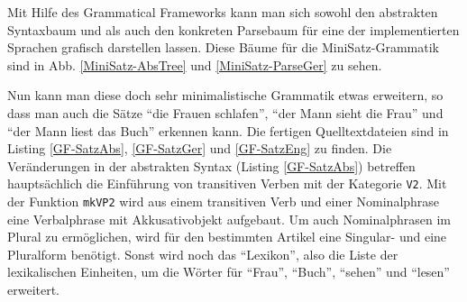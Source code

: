 Mit Hilfe des Grammatical Frameworks kann man sich sowohl den abstrakten Syntaxbaum und als auch den konkreten Parsebaum für eine der implementierten Sprachen grafisch darstellen lassen. Diese Bäume für die MiniSatz-Grammatik sind in Abb. \ref{MiniSatz-AbsTree} und \ref{MiniSatz-ParseGer} zu sehen. \par

Nun kann man diese doch sehr minimalistische Grammatik etwas erweitern, so dass man auch die Sätze "`die Frauen schlafen"', "`der Mann sieht die Frau"' und "`der Mann liest das Buch"' erkennen kann. Die fertigen Quelltextdateien sind in Listing \ref{GF-SatzAbs}, \ref{GF-SatzGer} und \ref{GF-SatzEng} zu finden. Die Veränderungen in der abstrakten Syntax (Listing \ref{GF-SatzAbs}) betreffen hauptsächlich die Einführung von transitiven Verben mit der Kategorie \texttt{V2}. Mit der Funktion \texttt{mkVP2} wird aus einem transitiven Verb und einer Nominalphrase eine Verbalphrase mit Akkusativobjekt aufgebaut. Um auch Nominalphrasen im Plural zu ermöglichen, wird für den bestimmten Artikel eine Singular- und eine Pluralform benötigt. Sonst wird noch das "`Lexikon"', also die Liste der lexikalischen Einheiten, um die Wörter für "`Frau"', "`Buch"', "`sehen"' und "`lesen"' erweitert. \par

